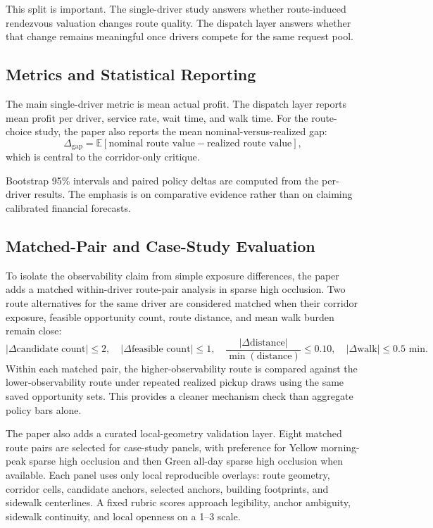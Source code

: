 \documentclass[journal]{IEEEtran}
\begin{document}
This split is important. The single-driver study answers whether route-induced rendezvous valuation changes route quality. The dispatch layer answers whether that change remains meaningful once drivers compete for the same request pool.

\subsection{Metrics and Statistical Reporting}
The main single-driver metric is mean actual profit. The dispatch layer reports mean profit per driver, service rate, wait time, and walk time. For the route-choice study, the paper also reports the mean nominal-versus-realized gap:
\[
\Delta_{\mathrm{gap}} = \mathbb{E}[\text{nominal route value} - \text{realized route value}],
\]
which is central to the corridor-only critique.

Bootstrap 95\% intervals and paired policy deltas are computed from the per-driver results. The emphasis is on comparative evidence rather than on claiming calibrated financial forecasts.

\subsection{Matched-Pair and Case-Study Evaluation}
To isolate the observability claim from simple exposure differences, the paper adds a matched within-driver route-pair analysis in sparse high occlusion. Two route alternatives for the same driver are considered matched when their corridor exposure, feasible opportunity count, route distance, and mean walk burden remain close:
\[
|\Delta \text{candidate count}| \le 2, \quad
|\Delta \text{feasible count}| \le 1, \quad
\frac{|\Delta \text{distance}|}{\min(\text{distance})} \le 0.10, \quad
|\Delta \text{walk}| \le 0.5 \text{ min}.
\]
Within each matched pair, the higher-observability route is compared against the lower-observability route under repeated realized pickup draws using the same saved opportunity sets. This provides a cleaner mechanism check than aggregate policy bars alone.

The paper also adds a curated local-geometry validation layer. Eight matched route pairs are selected for case-study panels, with preference for Yellow morning-peak sparse high occlusion and then Green all-day sparse high occlusion when available. Each panel uses only local reproducible overlays: route geometry, corridor cells, candidate anchors, selected anchors, building footprints, and sidewalk centerlines. A fixed rubric scores approach legibility, anchor ambiguity, sidewalk continuity, and local openness on a 1--3 scale.
\end{document}
